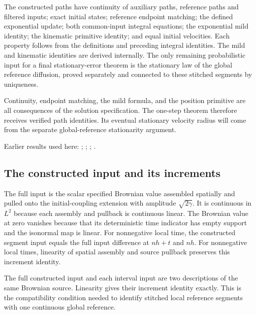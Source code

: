 \documentclass[11pt,a4paper]{report}
\begin{document}
The constructed paths have continuity of auxiliary paths, reference paths and filtered inputs; exact initial states; reference endpoint matching; the defined exponential update; both common-input integral equations; the exponential mild identity; the kinematic primitive identity; and equal initial velocities. Each property follows from the definitions and preceding integral identities. The mild and kinematic identities are derived internally. The only remaining probabilistic input for a final stationary-error theorem is the stationary law of the global reference diffusion, proved separately and connected to these stitched segments by uniqueness.



Continuity, endpoint matching, the mild formula, and the position primitive are all consequences of the solution specification. The one-step theorem therefore receives verified path identities. Its eventual stationary velocity radius will come from the separate global-reference stationarity argument.



Earlier results used here: \cite[Section~3.13.2]{LangevinLean2026ULASC}; \cite[Section~3.13.5]{LangevinLean2026ULASC}; \cite[Section~3.17.1]{LangevinLean2026ULASC}; \cite[Section~3.17.2]{LangevinLean2026ULASC}.
\subsection{\texorpdfstring{The constructed input and its increments}{The constructed input and its increments}}
\label{report-step-KineticLangevin-GenericCanonicalKLMC-lean-8}


The full input is the scalar specified Brownian value assembled spatially and pulled onto the initial-coupling extension with amplitude \(\sqrt{2\gamma}\). It is continuous in \(L^{2}\) because each assembly and pullback is continuous linear. The Brownian value at zero vanishes because that its deterministic time indicator has empty support and the isonormal map is linear. For nonnegative local time, the constructed segment input equals the full input difference at \(nh+t\) and \(nh\). For nonnegative local times, linearity of spatial assembly and source pullback preserves this increment identity.



The full constructed input and each interval input are two descriptions of the same Brownian source. Linearity gives their increment identity exactly. This is the compatibility condition needed to identify stitched local reference segments with one continuous global reference.
\end{document}

